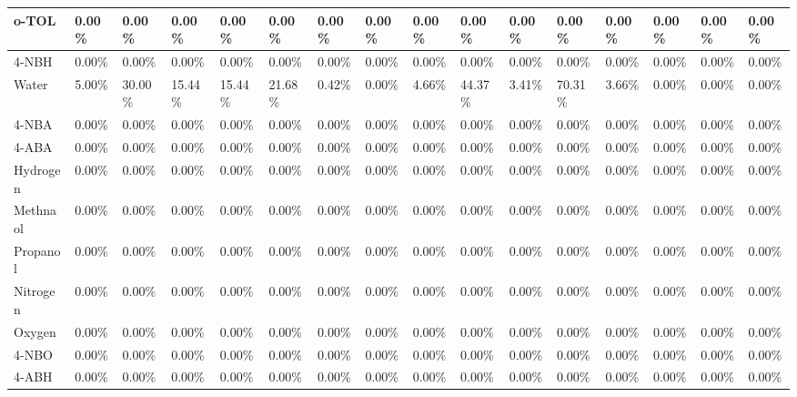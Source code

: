 \begin{landscape}
\begin{table}[H]
\begin{tabular}{|l|l|l|l|l|l|l|l|l|l|l|l|l|l|l|l|}
o-TOL                   & 0.00\%  & 0.00\%  & 0.00\%  & 0.00\%  & 0.00\%  & 0.00\%  & 0.00\%  & 0.00\%  & 0.00\%  & 0.00\%  & 0.00\%  & 0.00\%  & 0.00\%  & 0.00\%   & 0.00\%  \\ \hline
4-NBH                   & 0.00\%  & 0.00\%  & 0.00\%  & 0.00\%  & 0.00\%  & 0.00\%  & 0.00\%  & 0.00\%  & 0.00\%  & 0.00\%  & 0.00\%  & 0.00\%  & 0.00\%  & 0.00\%   & 0.00\%  \\ \hline
Water                   & 5.00\%  & 30.00\% & 15.44\% & 15.44\% & 21.68\% & 0.42\%  & 0.00\%  & 4.66\%  & 44.37\% & 3.41\%  & 70.31\% & 3.66\%  & 0.00\%  & 0.00\%   & 0.00\%  \\ \hline
4-NBA                   & 0.00\%  & 0.00\%  & 0.00\%  & 0.00\%  & 0.00\%  & 0.00\%  & 0.00\%  & 0.00\%  & 0.00\%  & 0.00\%  & 0.00\%  & 0.00\%  & 0.00\%  & 0.00\%   & 0.00\%  \\ \hline
4-ABA                   & 0.00\%  & 0.00\%  & 0.00\%  & 0.00\%  & 0.00\%  & 0.00\%  & 0.00\%  & 0.00\%  & 0.00\%  & 0.00\%  & 0.00\%  & 0.00\%  & 0.00\%  & 0.00\%   & 0.00\%  \\ \hline
Hydrogen                & 0.00\%  & 0.00\%  & 0.00\%  & 0.00\%  & 0.00\%  & 0.00\%  & 0.00\%  & 0.00\%  & 0.00\%  & 0.00\%  & 0.00\%  & 0.00\%  & 0.00\%  & 0.00\%   & 0.00\%  \\ \hline
Methnaol                & 0.00\%  & 0.00\%  & 0.00\%  & 0.00\%  & 0.00\%  & 0.00\%  & 0.00\%  & 0.00\%  & 0.00\%  & 0.00\%  & 0.00\%  & 0.00\%  & 0.00\%  & 0.00\%   & 0.00\%  \\ \hline
Propanol                & 0.00\%  & 0.00\%  & 0.00\%  & 0.00\%  & 0.00\%  & 0.00\%  & 0.00\%  & 0.00\%  & 0.00\%  & 0.00\%  & 0.00\%  & 0.00\%  & 0.00\%  & 0.00\%   & 0.00\%  \\ \hline
Nitrogen                & 0.00\%  & 0.00\%  & 0.00\%  & 0.00\%  & 0.00\%  & 0.00\%  & 0.00\%  & 0.00\%  & 0.00\%  & 0.00\%  & 0.00\%  & 0.00\%  & 0.00\%  & 0.00\%   & 0.00\%  \\ \hline
Oxygen                  & 0.00\%  & 0.00\%  & 0.00\%  & 0.00\%  & 0.00\%  & 0.00\%  & 0.00\%  & 0.00\%  & 0.00\%  & 0.00\%  & 0.00\%  & 0.00\%  & 0.00\%  & 0.00\%   & 0.00\%  \\ \hline
4-NBO                   & 0.00\%  & 0.00\%  & 0.00\%  & 0.00\%  & 0.00\%  & 0.00\%  & 0.00\%  & 0.00\%  & 0.00\%  & 0.00\%  & 0.00\%  & 0.00\%  & 0.00\%  & 0.00\%   & 0.00\%  \\ \hline
4-ABH                   & 0.00\%  & 0.00\%  & 0.00\%  & 0.00\%  & 0.00\%  & 0.00\%  & 0.00\%  & 0.00\%  & 0.00\%  & 0.00\%  & 0.00\%  & 0.00\%  & 0.00\%  & 0.00\%   & 0.00\%  \\ \hline

\end{tabular}
\end{table}
\end{landscape}
